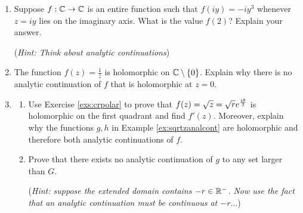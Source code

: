 \begin{exercises}{}
\begin{enumerate}
		
		\item Suppose $f:\mathbb{C}\to\mathbb{C}$ is an entire function such that $f(iy)=-iy^3$ whenever $z=iy$ lies on the imaginary axis. What is the value $f(2)$? Explain your answer.\par
		(\emph{Hint: Think about analytic continuations})
		
		
		\item The function $f(z)=\frac 1z$ is holomorphic on $\mathbb{C}\setminus\{0\}$. Explain why there is no analytic continuation of $f$ that is holomorphic at $z=0$.
		
		
		\item\label{exs:sqrtzdiff}
		\begin{enumerate}
		  \item Use Exercise \ref{exs:crpolar} to prove that $f(z)=\sqrt z=\sqrt re^{\frac{i\theta}{2}}$ is holomorphic on the first quadrant and find $f'(z)$. Moreover, explain why the functions $g,h$ in Example \ref{ex:sqrtzanalcont} are holomorphic and therefore both analytic continuations of $f$.
		  
		  \item Prove that there exists no analytic continuation of $g$ to any set larger than $G$.\par
			(\emph{Hint: suppose the extended domain contains $-r\in\mathbb{R}^-$. Now use the fact that an analytic continuation must be continuous at $-r\ldots$})
		\end{enumerate}
	\end{enumerate}
\end{exercises}